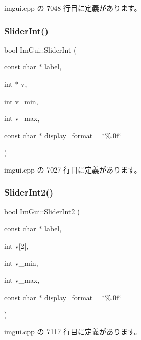 imgui.\+cpp の 7048 行目に定義があります。

\mbox{\label{namespace_im_gui_adfa3869210878bbf2c92c3c9383534f5}} 
\subsubsection{\texorpdfstring{Slider\+Int()}{SliderInt()}}
{\footnotesize\ttfamily bool Im\+Gui\+::\+Slider\+Int (\begin{DoxyParamCaption}\item[{const char $\ast$}]{label,  }\item[{int $\ast$}]{v,  }\item[{int}]{v\+\_\+min,  }\item[{int}]{v\+\_\+max,  }\item[{const char $\ast$}]{display\+\_\+format = {\ttfamily \char`\"{}\%.0f\char`\"{}} }\end{DoxyParamCaption})}



 imgui.\+cpp の 7027 行目に定義があります。

\mbox{\label{namespace_im_gui_a9dbd0490704d3bb4be10fdebe21d402d}} 
\subsubsection{\texorpdfstring{Slider\+Int2()}{SliderInt2()}}
{\footnotesize\ttfamily bool Im\+Gui\+::\+Slider\+Int2 (\begin{DoxyParamCaption}\item[{const char $\ast$}]{label,  }\item[{int}]{v\mbox{[}2\mbox{]},  }\item[{int}]{v\+\_\+min,  }\item[{int}]{v\+\_\+max,  }\item[{const char $\ast$}]{display\+\_\+format = {\ttfamily \char`\"{}\%.0f\char`\"{}} }\end{DoxyParamCaption})}



 imgui.\+cpp の 7117 行目に定義があります。

\mbox{\label{namespace_im_gui_a099188a7fdaad1a8103e6e24f41e1a8a}} 

